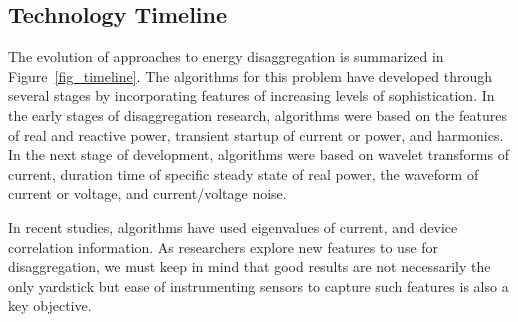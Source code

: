 \subsection{Technology Timeline}
The evolution of approaches to energy disaggregation is summarized in Figure~\ref{fig_timeline}.  
The algorithms for this problem  have developed through several stages by incorporating 
features of increasing levels of sophistication. 
In the early stages of disaggregation research, algorithms were based
on the features of real and reactive power, transient startup of current or power, and 
harmonics. In the next stage of development, algorithms were based on wavelet
transforms of current, 
duration time of specific steady state of real power, the waveform of current or voltage, 
and current/voltage noise. 

In recent studies, algorithms have used eigenvalues of current, and
device correlation information. As researchers explore new features to use
for disaggregation, we must keep in mind that good results are not necessarily
the only yardstick but ease of instrumenting sensors to capture such features
is also a key objective.

